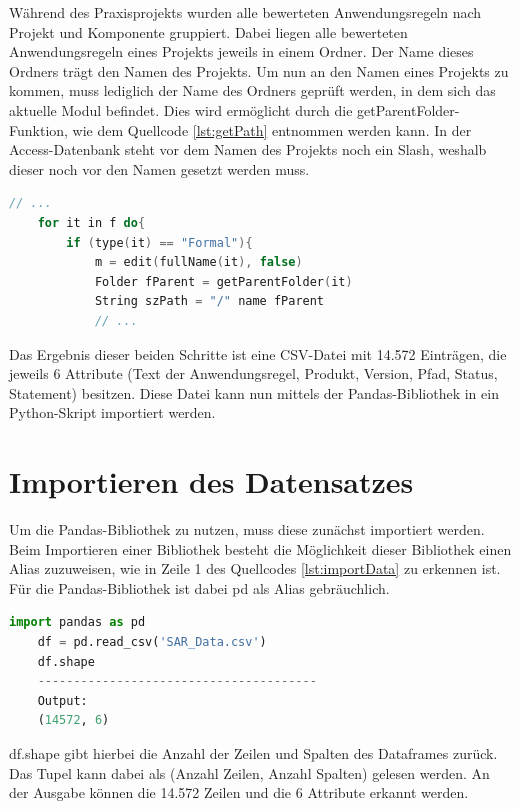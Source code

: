 Während des Praxisprojekts wurden alle bewerteten Anwendungsregeln nach Projekt und Komponente gruppiert. Dabei liegen alle bewerteten Anwendungsregeln eines Projekts jeweils in einem Ordner.
Der Name dieses Ordners trägt den Namen des Projekts. Um nun an den Namen eines Projekts zu kommen, muss lediglich der Name des Ordners geprüft werden, in dem sich das aktuelle Modul befindet.
Dies wird ermöglicht durch die getParentFolder-Funktion, wie dem Quellcode \ref*{lst:getPath} entnommen werden kann. In der Access-Datenbank steht vor dem Namen des Projekts noch ein 
Slash, weshalb dieser noch vor den Namen gesetzt werden muss.

\begin{lstlisting}[language = C++, caption={Projektnamen bestimmen},captionpos=b, label = lst:getPath, float, floatplacement=H]
    // ...
    for it in f do{
        if (type(it) == "Formal"){
            m = edit(fullName(it), false)
            Folder fParent = getParentFolder(it)
            String szPath = "/" name fParent
            // ...
\end{lstlisting}

Das Ergebnis dieser beiden Schritte ist eine CSV-Datei mit 14.572 Einträgen, die jeweils 6 Attribute (Text der Anwendungsregel, Produkt, Version, Pfad, Status, Statement) besitzen.
Diese Datei kann nun mittels der Pandas-Bibliothek in ein Python-Skript importiert werden.

\section{Importieren des Datensatzes}
Um die Pandas-Bibliothek zu nutzen, muss diese zunächst importiert werden. Beim Importieren einer Bibliothek besteht die Möglichkeit dieser Bibliothek einen Alias zuzuweisen,
wie in Zeile 1 des Quellcodes \ref*{lst:importData} zu erkennen ist. Für die Pandas-Bibliothek ist dabei pd als Alias gebräuchlich.

\begin{lstlisting}[language = python, caption={Pandas und den Datensatz importieren},captionpos=b, label = lst:importData, floatplacement=H]
    import pandas as pd
    df = pd.read_csv('SAR_Data.csv')
    df.shape
    ---------------------------------------
    Output:
    (14572, 6)
\end{lstlisting}

df.shape gibt hierbei die Anzahl der Zeilen und Spalten des Dataframes zurück. Das Tupel kann dabei als (Anzahl Zeilen, Anzahl Spalten) gelesen werden.
An der Ausgabe können die 14.572 Zeilen und die 6 Attribute erkannt werden.

